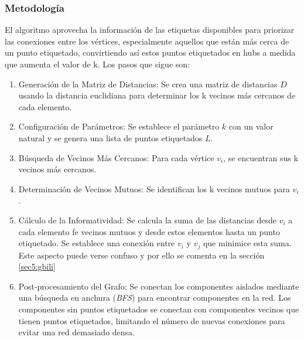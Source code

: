 \subsubsection{Metodología}
El algoritmo aprovecha la información de las etiquetas disponibles para priorizar las conexiones entre los vértices, especialmente aquellos que están más cerca de un punto etiquetado, convirtiendo así estos puntos etiquetados en hubs a medida que aumenta el valor de k.
Los pasos que sigue son:
\begin{enumerate}
	\item Generación de la Matriz de Distancias: Se crea una matriz de distancias $D$ usando la distancia euclidiana para determinar los k vecinos más cercanos de cada elemento.
	\item Configuración de Parámetros: Se establece el parámetro $k$ con un valor natural y se genera una lista de puntos etiquetados	$L$.
	\item Búsqueda de Vecinos Más Cercanos: Para cada vértice $v_i$, se encuentran sus k vecinos más cercanos.
	\item Determinación de Vecinos Mutuos: Se identifican los k vecinos mutuos para $v_i$.
	\item Cálculo de la Informatividad: Se calcula la suma de las distancias desde $v_i$ a cada elemento fe vecinos mutuos y desde estos elementos hasta un punto etiquetado. Se establece una conexión entre $v_i$ y $v_j$ que minimice esta suma. Este aspecto puede verse confuso y por ello se comenta en la sección \ref{sec5:gbili}
	\item Post-procesamiento del Grafo: Se conectan los componentes aislados mediante una búsqueda en anchura (\textit{BFS}) para encontrar componentes en la red. Los componentes sin puntos etiquetados se conectan con componentes vecinos que tienen puntos etiquetados, limitando el número de nuevas conexiones para evitar una red demasiado densa.
\end{enumerate}


